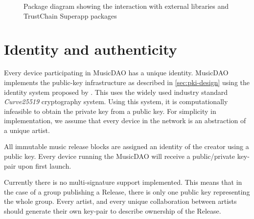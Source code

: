 \begin{figure}
        \caption{Package diagram showing the interaction with external libraries and TrustChain Superapp packages}
    \label{fig:package-diagram}
    \endminipage
\end{figure}

\section{Identity and authenticity}
\label{sec:identity-authenticity}
Every device participating in MusicDAO has a unique identity. MusicDAO implements the public-key infrastructure as described in \ref{sec:pki-design} using the identity system proposed by \cite{mattskala2020}. This uses the widely used industry standard \textit{Curve25519} cryptography system. Using this system, it is computationally infeasible to obtain the private key from a  public key. For simplicity in implementation, we assume that every device in the network is an abstraction of a unique artist. 

All immutable music release blocks are assigned an identity of the creator using a public key. Every device running the MusicDAO will receive a public/private key-pair upon first launch. 

Currently there is no multi-signature support implemented. This means that in the case of a group publishing a Release, there is only one public key representing the whole group. Every artist, and every unique collaboration between artists should generate their own key-pair to describe ownership of the Release.


